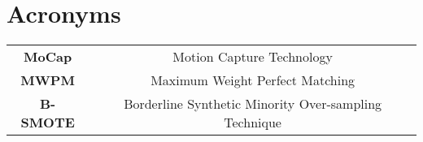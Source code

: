 \section*{\Huge Acronyms}



\begin{table}[H]
    \begin{tabular}{c c}
        \textbf{MoCap} & Motion Capture Technology \\
        \textbf{MWPM} & Maximum Weight Perfect Matching \\
        \textbf{B-SMOTE} & Borderline Synthetic Minority Over-sampling Technique \\
    \end{tabular}
\end{table}